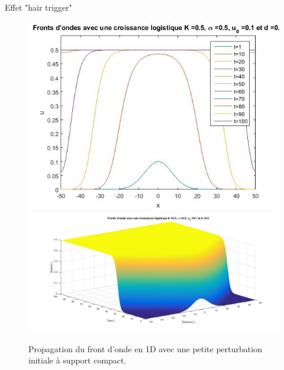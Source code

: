 \documentclass[10pt]{beamer}
\begin{document}
\begin{frame}{Effet "hair trigger"}{}
\begin{figure}[H]
	\centering
	\includegraphics[width=0.45\linewidth]{SimulationKPP/TrigerEffect/fronts}\hfill
	\includegraphics[width=0.55\linewidth]{SimulationKPP/TrigerEffect/Surf}\hfill
	\caption{Propagation du front d'onde en 1D avec une petite perturbation initiale à support compact.}
\end{figure}
\end{frame}
\end{document}
